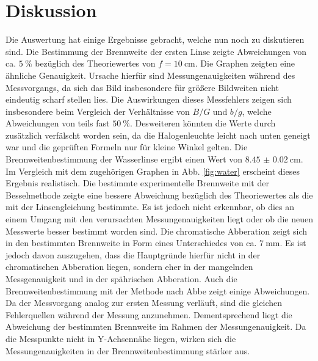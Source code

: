 
\section{Diskussion}
\label{sec:Diskussion}
Die Auswertung hat einige Ergebnisse gebracht, welche nun noch zu diskutieren sind.
Die Bestimmung der Brennweite der ersten Linse zeigte Abweichungen von
 ca. $\SI{5}{\percent}$ bezüglich des Theoriewertes von $f = \SI{10}{\centi\meter}$.
  Die Graphen zeigten eine ähnliche Genauigkeit. Ursache hierfür sind
   Messungenauigkeiten während des Messvorgangs, da sich das Bild insbesondere für
   größere Bildweiten nicht eindeutig scharf stellen lies. Die Auswirkungen dieses Messfehlers
   zeigen sich insbesondere beim Vergleich der Verhältnisse von $B/G$ und $b/g$,
    welche Abweichungen von teils fast $\SI{50}{\percent}$. Desweiteren könnten
     die Werte durch zusätzlich verfälscht worden sein, da die Halogenleuchte leicht
      nach unten geneigt war und die geprüften Formeln nur für kleine Winkel gelten. Die
      Brennweitenbestimmung der Wasserlinse ergibt einen Wert von $\SI{8.45(2)}{\centi\meter}$.
      Im Vergleich mit dem zugehörigen Graphen in Abb. \ref{fig:water} erscheint dieses Ergebnis realistisch.
       Die bestimmte experimentelle Brennweite mit der Besselmethode zeigte eine
        bessere Abweichung bezüglich des Theoriewertes als die mit der Linsengleichung bestimmte.
        Es ist jedoch nicht erkennbar, ob dies an einem Umgang mit den verursachten
         Messungenauigkeiten liegt oder ob die neuen Messwerte besser bestimmt worden sind.
         Die chromatische Abberation zeigt sich in den bestimmten
         Brennweite in Form eines Unterschiedes von ca. $\SI{7}{\milli\meter}$. Es
          ist jedoch davon auszugehen, dass die Hauptgründe hierfür nicht in der
           chromatischen Abberation liegen, sondern eher in der mangelnden
            Messgenauigkeit und in der spährischen Abberation. Auch die
            Brennweitenbestimmung mit der Methode nach Abbe zeigt einige Abweichungen.
            Da der Messvorgang analog zur ersten Messung verläuft, sind die
            gleichen Fehlerquellen während der Messung anzunehmen. Dementsprechend
            liegt die Abweichung der bestimmten Brennweite im Rahmen der Messungenauigkeit.
            Da die Messpunkte
             nicht in Y-Achsennähe liegen, wirken sich die Messungenauigkeiten
             in der Brennweitenbestimmung stärker aus.
